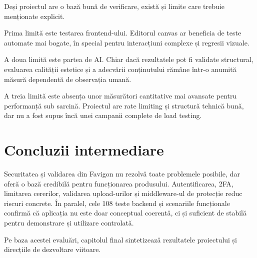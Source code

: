 Deși proiectul are o bază bună de verificare, există și limite care trebuie menționate explicit.

Prima limită este testarea frontend-ului. Editorul canvas ar beneficia de teste automate mai bogate, în special pentru interacțiuni complexe și regresii vizuale.

A doua limită este partea de AI. Chiar dacă rezultatele pot fi validate structural, evaluarea calității estetice și a adecvării conținutului rămâne într-o anumită măsură dependentă de observația umană.

A treia limită este absența unor măsurători cantitative mai avansate pentru performanță sub sarcină. Proiectul are rate limiting și structură tehnică bună, dar nu a fost supus încă unei campanii complete de load testing.

\section{Concluzii intermediare}

Securitatea și validarea din Favigon nu rezolvă toate problemele posibile, dar oferă o bază credibilă pentru funcționarea produsului. Autentificarea, 2FA, limitarea cererilor, validarea upload-urilor și middleware-ul de protecție reduc riscuri concrete. În paralel, cele 108 teste backend și scenariile funcționale confirmă că aplicația nu este doar conceptual coerentă, ci și suficient de stabilă pentru demonstrare și utilizare controlată.

Pe baza acestei evaluări, capitolul final sintetizează rezultatele proiectului și direcțiile de dezvoltare viitoare.


